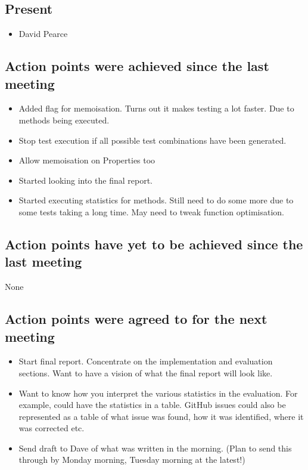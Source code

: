 \documentclass[]{article}
\begin{document}
\subsection{Present}
\begin{itemize}
	\item David Pearce
\end{itemize}

\subsection{Action points were achieved since the last meeting}
\begin{itemize}
	\item Added flag for memoisation. Turns out it makes testing a lot faster. Due to methods being executed.
	\item Stop test execution if all possible test combinations have been generated.
	\item Allow memoisation on Properties too
	\item Started looking into the final report.
	\item Started executing statistics for methods. Still need to do some more due to some tests taking a long time. May need to tweak function optimisation.
\end{itemize}
\subsection{Action points have yet to be achieved since the last meeting}
None
\subsection{Action points were agreed to for the next meeting}

\begin{itemize}
	\item Start final report. Concentrate on the implementation and evaluation sections. Want to have a vision of what the final report will look like.
	\item Want to know how you interpret the various statistics in the evaluation. For example, could have the statistics in a table. GitHub issues could also be represented as a table of what issue was found, how it was identified, where it was corrected etc.
	\item Send draft to Dave of what was written in the morning. (Plan to send this through by Monday morning, Tuesday morning at the latest!)
\end{itemize}
\end{document}
